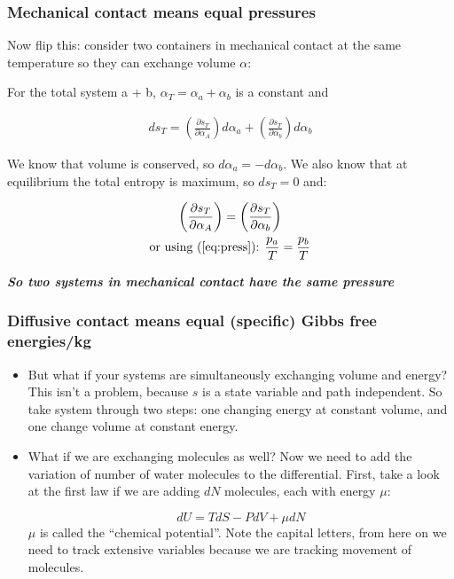 \documentclass[hyperref={colorlinks=true,linkcolor=blue,urlcolor=blue},numbers]{beamer}
\begin{document}
\begin{frame}
  \frametitle{Mechanical contact means equal pressures}
Now flip this:  consider two containers in mechanical contact at the
same temperature so they can exchange volume $\alpha$:

For the total system a + b, $\alpha_{T} = \alpha_a + \alpha_b$ is a constant and

\begin{gather*}
  ds_{T} = \left ( \frac{\partial s_T }{\partial \alpha_A}   \right ) d\alpha_a
+ \left ( \frac{\partial s_T }{\partial \alpha_b} \right ) d\alpha_b
\end{gather*}

We know that volume is conserved, so $d\alpha_a = -d\alpha_b$.  
We also know that
at equilibrium the total entropy is maximum, so $ds_T = 0$ and:

\begin{gather}
  \left ( \frac{\partial s_T }{\partial \alpha_A} \right ) 
= \left ( \frac{\partial s_T }{\partial \alpha_b} \right )\nonumber\\
\text{or using (\ref{eq:press}): } \frac{ p_a}{T}  = \frac{ p_b}{T}
\label{eq:press} 
\end{gather}

\textit{\textbf{So two systems in mechanical contact have the same pressure}}

\end{frame}

\begin{frame}
  \frametitle{Diffusive contact means equal (specific) Gibbs free energies/kg}

  \begin{itemize}
  \item But what if your systems are simultaneously exchanging volume and energy?
This isn't a problem, because $s$ is a state variable and path independent.
So take system through two steps: one changing energy at constant
volume, and one change volume at constant energy.

\item What if we are exchanging molecules as well?  Now we need to add the
variation of number of water molecules to
the differential.  First, take a look at the first law if we
are adding  $dN$ molecules, each with energy $\mu$:

\begin{equation}
\label{eq:chem}
  dU = T dS - PdV + \mu dN
\end{equation}
$\mu$ is called the ``chemical potential''.  Note the capital letters, from here on
we need to track extensive variables because we are tracking movement of molecules.
  \end{itemize}

\end{frame}
\end{document}
